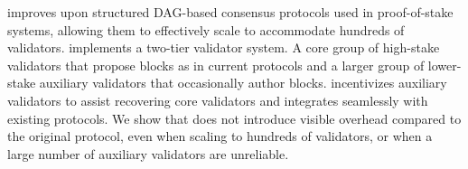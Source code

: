 \sysname improves upon structured DAG-based consensus protocols used in proof-of-stake systems, allowing them to effectively scale to accommodate hundreds of validators. \sysname implements a two-tier validator system. A core group of high-stake validators that propose blocks as in current protocols and a larger group of lower-stake auxiliary validators that occasionally author blocks. \sysname incentivizes auxiliary validators to assist recovering core validators and integrates seamlessly with existing protocols. We show that \sysname does not introduce visible overhead compared to the original protocol, even when scaling to hundreds of validators, or when a large number of auxiliary validators are unreliable.